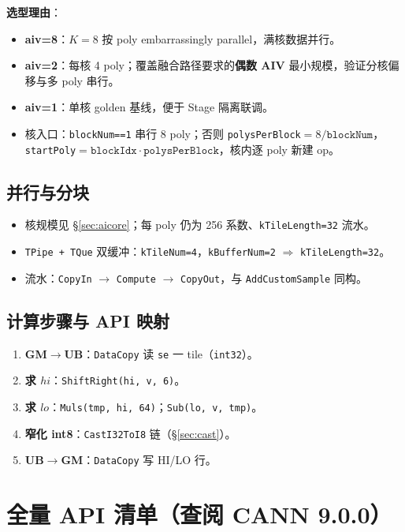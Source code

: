 \documentclass[UTF8,a4paper,11pt]{ctexart}
\begin{document}
\textbf{选型理由}：
\begin{itemize}
  \item \textbf{aiv=8}：$K=8$ 按 poly embarrassingly parallel，满核数据并行。
  \item \textbf{aiv=2}：每核 4 poly；覆盖融合路径要求的\textbf{偶数 AIV} 最小规模，验证分核偏移与多 poly 串行。
  \item \textbf{aiv=1}：单核 golden 基线，便于 Stage 隔离联调。
  \item 核入口：\texttt{blockNum==1} 串行 8 poly；否则 \texttt{polysPerBlock}$=8/\texttt{blockNum}$，\texttt{startPoly}$=\texttt{blockIdx}\cdot\texttt{polysPerBlock}$，核内逐 poly 新建 op。
\end{itemize}

\subsection{并行与分块}
\begin{itemize}
  \item 核规模见 §\ref{sec:aicore}；每 poly 仍为 256 系数、\texttt{kTileLength=32} 流水。
  \item \texttt{TPipe + TQue} 双缓冲：\texttt{kTileNum=4}，\texttt{kBufferNum=2} $\Rightarrow$ \texttt{kTileLength=32}。
  \item 流水：\texttt{CopyIn} $\rightarrow$ \texttt{Compute} $\rightarrow$ \texttt{CopyOut}，与 \texttt{AddCustomSample} 同构。
\end{itemize}

\subsection{计算步骤与 API 映射}
\begin{enumerate}
  \item \textbf{GM$\rightarrow$UB}：\texttt{DataCopy} 读 \texttt{se} 一 tile（\texttt{int32}）。
  \item \textbf{求 $hi$}：\texttt{ShiftRight(hi, v, 6)}。
  \item \textbf{求 $lo$}：\texttt{Muls(tmp, hi, 64)}；\texttt{Sub(lo, v, tmp)}。
  \item \textbf{窄化 int8}：\texttt{CastI32ToI8} 链（§\ref{sec:cast}）。
  \item \textbf{UB$\rightarrow$GM}：\texttt{DataCopy} 写 HI/LO 行。
\end{enumerate}

\section{全量 API 清单（查阅 CANN 9.0.0）}
\label{sec:api-table}
\end{document}
